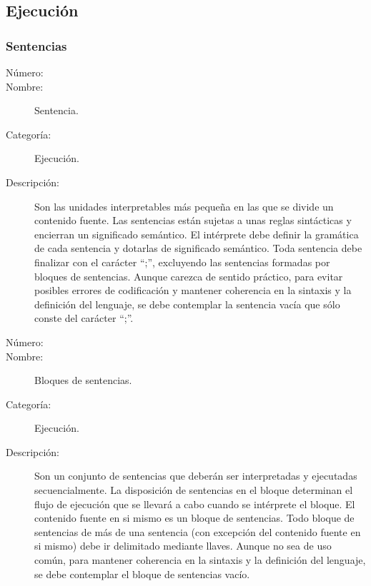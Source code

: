 \subsection{Ejecución}
\subsubsection{Sentencias}
\begin{framed}
	\begin{description}
		\item [Número:] \cn
		\item [Nombre:] Sentencia.
		\item [Categoría:] Ejecución.
		\item [Descripción:] Son las unidades interpretables más pequeña en las que se divide un contenido fuente. Las sentencias están sujetas a
		unas reglas sintácticas y encierran un significado semántico. El intérprete debe definir la gramática de cada sentencia y dotarlas de significado
		semántico. Toda sentencia debe finalizar con el carácter ``;'', excluyendo las sentencias formadas por bloques de sentencias. Aunque carezca
		de sentido práctico, para evitar posibles errores de codificación y mantener coherencia en la sintaxis y la definición del lenguaje, se debe
		contemplar la sentencia vacía que sólo conste del carácter ``;''.
	\end {description}
\end{framed}

\begin{framed}
	\begin{description}
		\item [Número:] \cn
		\item [Nombre:] Bloques de sentencias.
		\item [Categoría:] Ejecución.
		\item [Descripción:] Son un conjunto de sentencias que deberán ser interpretadas y ejecutadas secuencialmente. La disposición de
		sentencias en el bloque determinan el flujo de ejecución que se llevará a cabo cuando se intérprete el bloque. El contenido fuente
		en si mismo es un bloque de sentencias. Todo bloque de sentencias de más de una sentencia (con excepción del contenido fuente en si mismo)
		debe ir delimitado mediante llaves. Aunque no sea de uso común, para mantener coherencia en la sintaxis y la definición del lenguaje, se debe
		contemplar el bloque de sentencias vacío.
	\end {description}
\end{framed}

